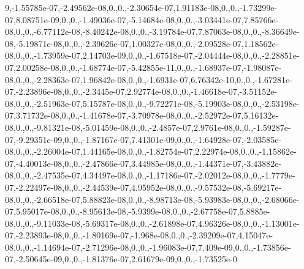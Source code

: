 \begin{DoxyCompactItemize}
9,-\/1.\-55785e-\/07,-\/2.\-49562e-\/08,0.,0.,-\/2.\-30654e-\/07,1.\-91183e-\/08,0.,0.,-\/1.\-73299e-\/07,8.\-08751e-\/09,0.,0.,-\/1.\-49036e-\/07,-\/5.\-14684e-\/08,0.,0.,-\/3.\-03441e-\/07,7.\-85766e-\/08,0.,0.,-\/6.\-77112e-\/08,-\/8.\-40242e-\/08,0.,0.,-\/3.\-19784e-\/07,7.\-87063e-\/08,0.,0.,-\/8.\-36649e-\/08,-\/5.\-19871e-\/08,0.,0.,-\/2.\-39626e-\/07,1.\-00327e-\/08,0.,0.,-\/2.\-09528e-\/07,1.\-18562e-\/08,0.,0.,-\/1.\-73959e-\/07,2.\-14703e-\/09,0.,0.,-\/1.\-67518e-\/07,-\/2.\-04444e-\/08,0.,0.,-\/2.\-28851e-\/07,2.\-00258e-\/08,0.,0.,-\/1.\-68774e-\/07,-\/5.\-42855e-\/11,0.,0.,-\/1.\-68937e-\/07,-\/1.\-98087e-\/08,0.,0.,-\/2.\-28363e-\/07,1.\-96842e-\/08,0.,0.,-\/1.\-6931e-\/07,6.\-76342e-\/10,0.,0.,-\/1.\-67281e-\/07,-\/2.\-23896e-\/08,0.,0.,-\/2.\-3445e-\/07,2.\-92774e-\/08,0.,0.,-\/1.\-46618e-\/07,-\/3.\-51152e-\/08,0.,0.,-\/2.\-51963e-\/07,5.\-15787e-\/08,0.,0.,-\/9.\-72271e-\/08,-\/5.\-19903e-\/08,0.,0.,-\/2.\-53198e-\/07,3.\-71732e-\/08,0.,0.,-\/1.\-41678e-\/07,-\/3.\-70978e-\/08,0.,0.,-\/2.\-52972e-\/07,5.\-16132e-\/08,0.,0.,-\/9.\-81321e-\/08,-\/5.\-01459e-\/08,0.,0.,-\/2.\-4857e-\/07,2.\-9761e-\/08,0.,0.,-\/1.\-59287e-\/07,-\/9.\-29351e-\/09,0.,0.,-\/1.\-87167e-\/07,7.\-41301e-\/09,0.,0.,-\/1.\-64928e-\/07,-\/2.\-03585e-\/08,0.,0.,-\/2.\-26004e-\/07,1.\-44165e-\/08,0.,0.,-\/1.\-82754e-\/07,2.\-22974e-\/08,0.,0.,-\/1.\-15862e-\/07,-\/4.\-40013e-\/08,0.,0.,-\/2.\-47866e-\/07,3.\-44985e-\/08,0.,0.,-\/1.\-44371e-\/07,-\/3.\-43882e-\/08,0.,0.,-\/2.\-47535e-\/07,4.\-34497e-\/08,0.,0.,-\/1.\-17186e-\/07,-\/2.\-02012e-\/08,0.,0.,-\/1.\-7779e-\/07,-\/2.\-22497e-\/08,0.,0.,-\/2.\-44539e-\/07,4.\-95952e-\/08,0.,0.,-\/9.\-57532e-\/08,-\/5.\-69217e-\/08,0.,0.,-\/2.\-66518e-\/07,5.\-88823e-\/08,0.,0.,-\/8.\-98713e-\/08,-\/5.\-93983e-\/08,0.,0.,-\/2.\-68066e-\/07,5.\-95017e-\/08,0.,0.,-\/8.\-95613e-\/08,-\/5.\-9399e-\/08,0.,0.,-\/2.\-67758e-\/07,5.\-8885e-\/08,0.,0.,-\/9.\-11033e-\/08,-\/5.\-69317e-\/08,0.,0.,-\/2.\-61898e-\/07,4.\-96326e-\/08,0.,0.,-\/1.\-13001e-\/07,-\/2.\-23893e-\/08,0.,0.,-\/1.\-80169e-\/07,-\/1.\-968e-\/08,0.,0.,-\/2.\-39209e-\/07,4.\-15047e-\/08,0.,0.,-\/1.\-14694e-\/07,-\/2.\-71296e-\/08,0.,0.,-\/1.\-96083e-\/07,7.\-409e-\/09,0.,0.,-\/1.\-73856e-\/07,-\/2.\-50645e-\/09,0.,0.,-\/1.\-81376e-\/07,2.\-61679e-\/09,0.,0.,-\/1.\-73525e-\/0
\end{DoxyCompactItemize}
